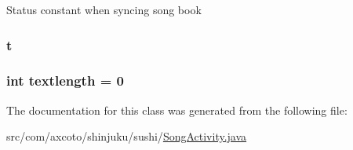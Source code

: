 \-Status constant when syncing song book \hypertarget{classcom_1_1axcoto_1_1shinjuku_1_1sushi_1_1_song_activity_a252c1917ce0331d17c88e12e2caeb4b3}{
\subsubsection[{t}]{ {\bf t}}}\label{classcom_1_1axcoto_1_1shinjuku_1_1sushi_1_1_song_activity_a252c1917ce0331d17c88e12e2caeb4b3}
\hypertarget{classcom_1_1axcoto_1_1shinjuku_1_1sushi_1_1_song_activity_aac688d92bbcf0a5e9a79ff4a44ac15ef}{
\subsubsection[{textlength}]{\setlength{\rightskip}{0pt plus 5cm}int {\bf textlength} = 0}}\label{classcom_1_1axcoto_1_1shinjuku_1_1sushi_1_1_song_activity_aac688d92bbcf0a5e9a79ff4a44ac15ef}


\-The documentation for this class was generated from the following file\-:\begin{DoxyCompactItemize}
\item 
src/com/axcoto/shinjuku/sushi/\hyperlink{_song_activity_8java}{\-Song\-Activity.\-java}\end{DoxyCompactItemize}
